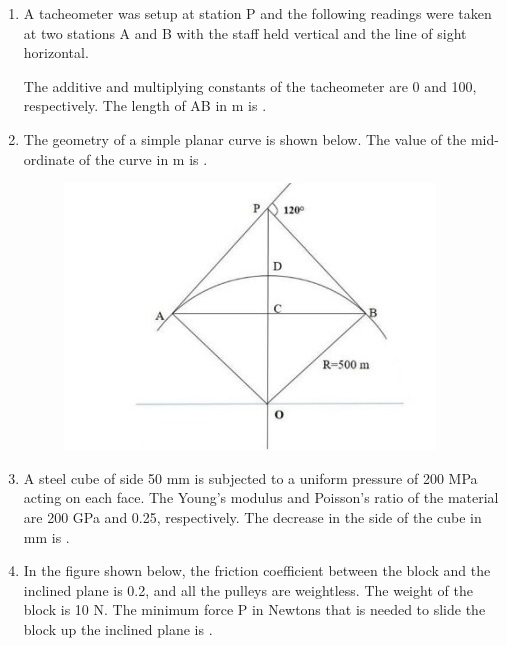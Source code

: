 \documentclass[journal,12pt,onecolumn]{IEEEtran}
\theoremstyle{remark}
\begin{document}
\begin{enumerate}
\item A tacheometer was setup at station P and the following readings were taken at two stations A and B with the staff held vertical and the line of sight horizontal.

The additive and multiplying constants of the tacheometer are 0 and 100, respectively.
The length of AB in m is \underline{\hspace{2cm}} .

\hfill{}

\item The geometry of a simple planar curve  is shown below. The value of the mid-ordinate of the curve in m is \underline{\hspace{2cm}} .

\hfill{}

\begin{figure}[H]
\centering
\includegraphics[width=0.6\columnwidth]{figs/2020mn50.jpeg}
\caption*{}
\label{fig:q50}
\end{figure}

\item A steel cube of side 50 mm is subjected to a uniform pressure of 200 MPa acting on each face. The Young's modulus and Poisson's ratio of the material are 200 GPa and 0.25, respectively. The decrease in the side of the cube in mm is \underline{\hspace{2cm}} .

\hfill{}

\item In the figure shown below, the friction coefficient between the block and the inclined plane is 0.2, and all the pulleys are weightless. The weight of the block is 10 N. The minimum force P in Newtons that is needed to slide the block up the inclined plane is \underline{\hspace{2cm}} .



\end{enumerate}
\end{document}
